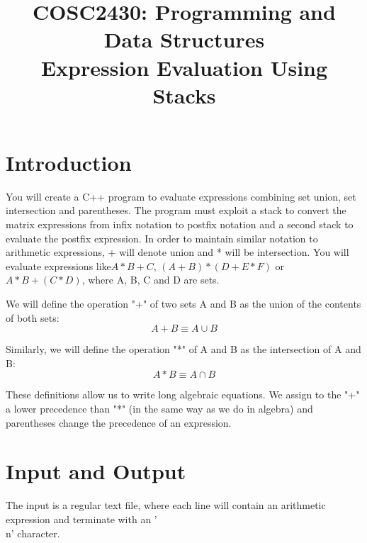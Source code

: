 
\title{COSC2430: Programming and Data Structures\\
Expression Evaluation Using Stacks
}

\date{}



\pagestyle{plain}
\let\thepage\relax  %

\maketitle

\section{Introduction}
You will create a C++ program to evaluate expressions combining set union, set intersection and parentheses.
The program must exploit a stack to convert the matrix expressions from infix notation to postfix notation
and a second stack to evaluate the postfix expression.
In order to maintain similar notation to arithmetic expressions, + will denote union and * will be intersection.
You will evaluate expressions like$ A * B + C$, $(A + B) * (D + E * F)$ or $A * B + (C * D)$, where
A, B, C and D are sets.

We will define the operation "+" of two sets A and B as the union of the contents of both sets:
\begin{equation}
A + B \equiv A \cup B
\end{equation}

Similarly, we will define the operation "*" of A and B as the intersection of A and B:
\begin{equation}
A * B \equiv A \cap B 
\end{equation}

These definitions allow us to write long algebraic equations. We assign to the "+" a lower precedence
than "*" (in the same way as we do in algebra) and parentheses change the precedence of an expression.
\section{Input and Output}

The input is a regular text file, where each line will contain an arithmetic expression and terminate with an '\\n' character. 

